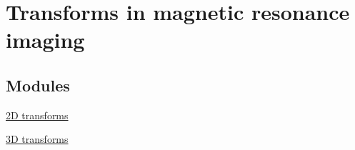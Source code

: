 \hypertarget{group__applications__mri}{
\section{Transforms in magnetic resonance imaging}
\label{group__applications__mri}
}
\subsection*{Modules}
\begin{CompactItemize}
\item 
\hyperlink{group__applications__mri2d}{2D transforms}
\item 
\hyperlink{group__applications__mri3d}{3D transforms}
\end{CompactItemize}
